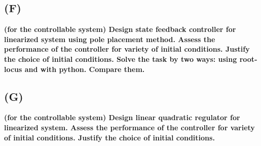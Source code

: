 \documentclass[a4paper,11pt]{article}
\theoremstyle{mytheor}
\begin{document}
\subsection*{(F)}
\textbf{(for the controllable system) Design state feedback controller for linearized system using pole placement method. Assess the performance
of the controller for variety of initial conditions. Justify the choice of
initial conditions. Solve the task by two ways: using root-locus and
with python. Compare them.}
\subsection*{(G)}
\textbf{(for the controllable system) Design linear quadratic regulator for linearized system. Assess the performance of the controller for variety
of initial conditions. Justify the choice of initial conditions.}
\end{document}
